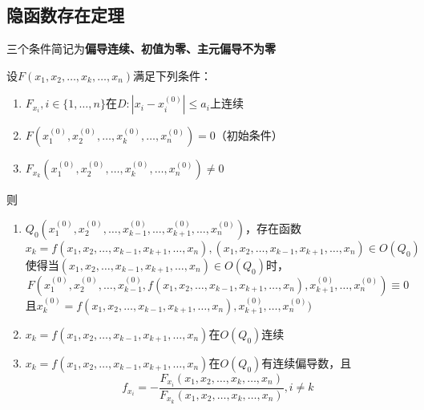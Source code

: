 \subsection{隐函数存在定理}
三个条件简记为\textbf{偏导连续、初值为零、主元偏导不为零}
\begin{theorem}
设$F(x_1,x_2,\ldots,x_k,\ldots,x_n)$满足下列条件：
\begin{enumerate}
	\item $F_{x_i},i\in\{1,\ldots,n\}$在$D:|x_i-x_i^{(0)}|\leq a_i$上连续
	\item $F(x_1^{(0)},x_2^{(0)},\ldots,x_k^{(0)},\ldots,x_n^{(0)})=0$（初始条件）
	\item $F_{x_k}(x_1^{(0)},x_2^{(0)},\ldots,x_k^{(0)},\ldots,x_n^{(0)})\ne0$
\end{enumerate}
则
\begin{enumerate}
	\item $Q_0(x_1^{(0)},x_2^{(0)},\ldots,x_{k-1}^{(0)},\ldots,x_{k+1}^{(0)},\ldots,x_n^{(0)})$，存在函数\[x_k=f(x_1,x_2,\ldots,x_{k-1},x_{k+1},\ldots,x_n),(x_1,x_2,\ldots,x_{k-1},x_{k+1},\ldots,x_n)\in O(Q_0)\]
	使得当$(x_1,x_2,\ldots,x_{k-1},x_{k+1},\ldots,x_n)\in O(Q_0)$时，
	\[F(x_1^{(0)},x_2^{(0)},\ldots,x_{k-1}^{(0)},f(x_1,x_2,\ldots,x_{k-1},x_{k+1},\ldots,x_n),x_{k+1}^{(0)},\ldots,x_n^{(0)})\equiv 0\]
	且$x_{k}^{(0)}=f(x_1,x_2,\ldots,x_{k-1},x_{k+1},\ldots,x_n),x_{k+1}^{(0)},\ldots,x_n^{(0)})$
	\item $x_k=f(x_1,x_2,\ldots,x_{k-1},x_{k+1},\ldots,x_n)$在$O(Q_0)$连续
	\item $x_k=f(x_1,x_2,\ldots,x_{k-1},x_{k+1},\ldots,x_n)$在$O(Q_0)$有连续偏导数，且
	\[f_{x_i}=-\frac{F_{x_i}(x_1,x_2,\ldots,x_k,\ldots,x_n)}{F_{x_k}(x_1,x_2,\ldots,x_k,\ldots,x_n)},i\ne k\]
\end{enumerate}
\end{theorem}
